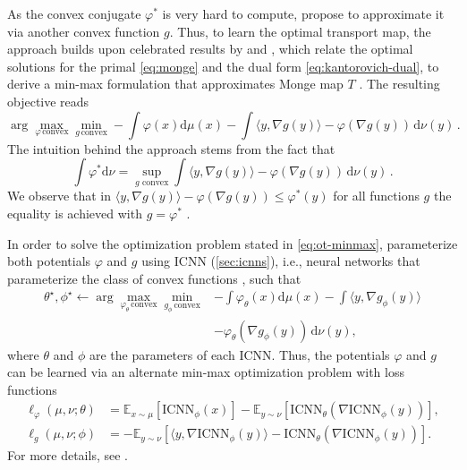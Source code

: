 As the convex conjugate $\varphi^*$ is very hard to compute, \citet{makkuva2020optimal} propose to approximate it via another convex function $g$.
Thus, to learn the optimal transport map, the approach builds upon celebrated results by \citet{knott1984optimal} and \citet{brenier1991polar}, which relate the optimal solutions for the primal \eqref{eq:monge} and the dual form \eqref{eq:kantorovich-dual}, to derive a min-max formulation that approximates Monge map $T$ \citep[Theorem 3.3]{makkuva2020optimal}.
The resulting objective reads
\begin{equation} \label{eq:ot-minmax}
	\arg \max_{\varphi  \, \text{convex}} \min_{g \, \text{convex}}  -\int \varphi(x) \mathrm{d} \mu(x) -\int \langle y, \nabla g(y)\rangle - \varphi(\nabla g(y)) \,\mathrm{d} \nu(y)\,.
\end{equation}
The intuition behind the approach stems from the fact that
\begin{equation*}
	\int \varphi^*\textrm{d}\nu = \sup _{g \text{ convex}} \int \langle y, \nabla g(y)\rangle - \varphi(\nabla g(y))\,\mathrm{d} \nu(y)\,.
\end{equation*}
We observe that in $\langle y, \nabla g(y)\rangle - \varphi(\nabla g(y)) \leq \varphi^*(y)$ for all functions $g$ the equality is achieved with $g = \varphi^*$ \citep[Theorem 3.3]{makkuva2020optimal}. 

In order to solve the optimization problem stated in \eqref{eq:ot-minmax}, \citet{makkuva2020optimal} parameterize both potentials $\varphi$ and $g$ using \acrfull{ICNN} (\cref{sec:icnns}), i.e., neural networks that parameterize the class of convex functions \citep{amos2017input}, such that
\begin{align} \label{eq:cellot-optim}
	\nonumber \theta^\star, \phi^\star \leftarrow \arg \max_{\varphi_\theta  \, \text{convex}} \min_{g_\phi \, \text{convex}}  &-\int \varphi_\theta(x) \mathrm{d} \mu(x) -\int \langle y, \nabla g_\phi(y)\rangle \\
	&- \varphi_\theta(\nabla g_\phi(y)) \,\mathrm{d} \nu(y),
\end{align}
where $\theta$ and $\phi$ are the parameters of each \acrshort{ICNN}.
Thus, the potentials $\varphi$ and $g$ can be learned via an alternate min-max optimization problem with loss functions
\begin{align} 
	\label{eq:makkuva_f_loss}
    \ell_\varphi(\mu, \nu; \theta) &= \mathbb{E}_{x \sim \mu}[\text{ICNN}_{\phi}(x)] - \mathbb{E}_{y \sim \nu}[\text{ICNN}_{\theta}(\nabla \text{ICNN}_{\phi}(y))],   \\
    \label{eq:makkuva_g_loss}
    \ell_g(\mu, \nu; \phi) &= -\mathbb{E}_{y \sim \nu}[\langle y, \nabla \text{ICNN}_{\phi}(y)\rangle-\text{ICNN}_{\theta}(\nabla \text{ICNN}_{\phi}(y))].
\end{align}
For more details, see \citet{makkuva2020optimal, korotin2021neural}.



